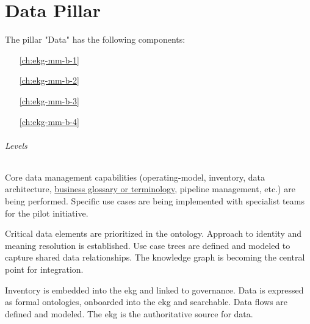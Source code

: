 \part{Data Pillar}\label{pt:ekgmm-b} %

The pillar "Data" has the following components:

\begin{itemize}[leftmargin=.5in]
  \item [\ref{ch:ekg-mm-b-1}] 
  \item [\ref{ch:ekg-mm-b-2}] 
  \item [\ref{ch:ekg-mm-b-3}] 
  \item [\ref{ch:ekg-mm-b-4}] 
\end{itemize}

\paragraph{Levels}

\begin{description}[nosep,font=\bfseries]

    \item [1. \ekgmmLevelOneLabel]
    Core data management capabilities (\gls{operating-model}, inventory, data architecture,
    \hyperref[sec:ekg-mm-business-terminology]{business glossary or terminology},
    pipeline management, etc.) are being performed.
    Specific use cases are being implemented with specialist teams for the pilot initiative.
    
    \item [2. \ekgmmLevelTwoLabel]
    Critical data elements are prioritized in the ontology.
    Approach to identity and meaning resolution is established.
    Use case trees are defined and modeled to capture shared data relationships.
    The knowledge graph is becoming the central point for integration.

    \item [3. \ekgmmLevelThreeLabel]
    Inventory is embedded into the \gls{ekg} and linked to governance.
    Data is expressed as formal ontologies, onboarded into the \gls{ekg} and searchable.
    Data flows are defined and modeled.
    The \gls{ekg} is the authoritative source for data.

\end{description}





